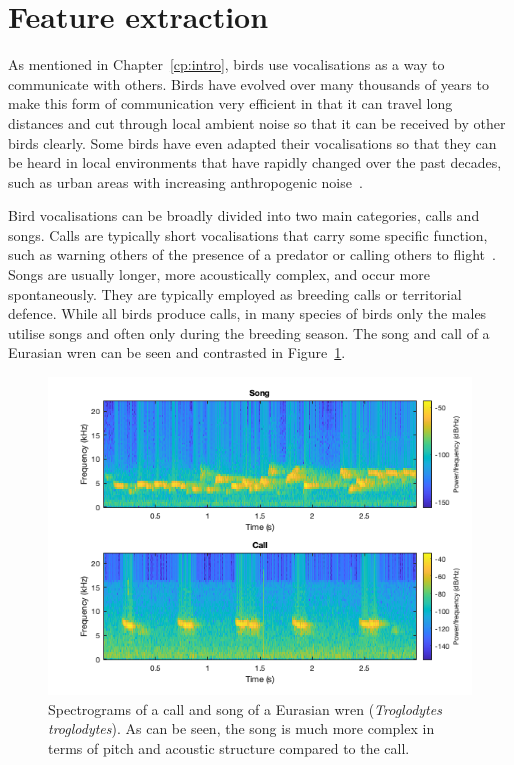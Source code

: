 \section{Feature extraction}\label{sec:feat_extraction}

As mentioned in Chapter~\ref{cp:intro}, birds use vocalisations as a way to
communicate with others. Birds have evolved over many thousands of years to make
this form of communication very efficient in that it can travel long distances
and cut through local ambient noise so that it can be received by other birds
clearly. Some birds have even adapted their vocalisations so that they can be
heard in local environments that have rapidly changed over the past decades,
such as urban areas with increasing anthropogenic noise~\cite{luther2010urban}.

Bird vocalisations can be broadly divided into two main categories, calls and
songs. Calls are typically short vocalisations that carry some specific
function, such as warning others of the presence of a predator or calling others
to flight~\cite{MARLER2004132}. Songs are usually longer, more acoustically
complex, and occur more spontaneously. They are typically employed as breeding
calls or territorial defence. While all birds produce calls, in many species of
birds only the males utilise songs and often only during the breeding season. The
song and call of a Eurasian wren can be seen and contrasted in
Figure~\ref{fig:wren_call_song_spectrogram}.

\begin{figure}[ht]
  \centering
  \includegraphics[width=\textwidth]{figures/wren_call_song_spectrogram.png}
  \caption{Spectrograms of a call and song of a Eurasian wren
  (\textit{Troglodytes troglodytes}). As can be seen, the song is much more
complex in terms of pitch and acoustic structure compared to the
call.}\label{fig:wren_call_song_spectrogram}
\end{figure}


